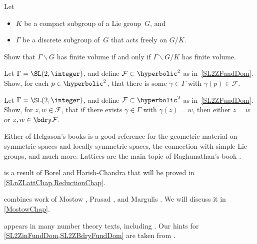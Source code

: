 \begin{exercises}
\item \label{lattice<>mu(X/Gamma)}
 Let
\begin{itemize}
 \item $K$ be a compact subgroup of a Lie group~$G$, and
 \item $\Gamma$ be a discrete subgroup of~$G$ that acts freely on
$G/K$.
 \end{itemize}
 Show that $\Gamma \backslash G$ has finite volume if and only if
$\Gamma \backslash G/K$ has finite volume.

\item \label{SL2ZinFundDom}
 Let $\Gamma = \SL(2,\integer)$, and define $\mathcal{F} \subset
\hyperbolic^2$ as in~\eqref{SL2ZFundDom}. Show, for each $p \in
\hyperbolic^2$, that there is some $\gamma \in \Gamma$ with
$\gamma(p) \in \mathcal{F}$.

\item \label{SL2ZBdryFundDom}
 Let $\Gamma = \SL(2,\integer)$, and define $\mathcal{F} \subset
\hyperbolic^2$ as in~\eqref{SL2ZFundDom}. Show, for $z,w \in
\mathcal{F}$, that if there exists $\gamma \in \Gamma$ with
$\gamma(z) = w$, then either $z = w$ or $z,w \in \bdry \mathcal{F}$.

 \end{exercises}



\begin{notes}

 Either of Helgason's books \cite{HelgasonBookOld, HelgasonBook} is a
good reference for the geometric material on symmetric spaces and
locally symmetric spaces, the connection with simple Lie groups, and
much more. Lattices are the main topic of Raghunathan's book
\cite{RaghunathanBook}. 

 is a result of Borel and Harish-Chandra
\cite{BorelHarishChandra} that will be proved in \cref{SLnZLattChap,ReductionChap}.

 combines work of Mostow
\cite{MostowRig}, Prasad \cite{PrasadRig}, and Margulis
\cite{Margulis-DiscGrpMot}. We will discuss it in  \cref{MostowChap}.

 appears in many number theory texts, including \cite[\S7.1.2, pp.~77--79]{Serre-CourseArith}. Our hints
for \cref{SL2ZinFundDom,SL2ZBdryFundDom} are taken
from \cite[Prop.~4.4, pp.~181--182]{PlatonovRapinchukBook}.

\end{notes}



